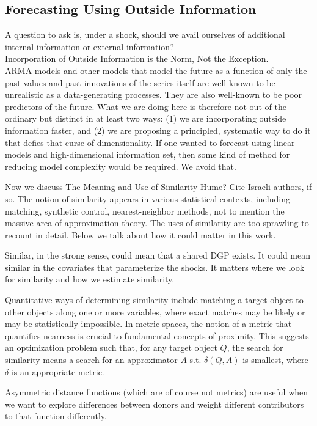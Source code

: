 \documentclass[11pt]{article}
\theoremstyle{definition}
\begin{document}
\subsection{Forecasting Using Outside Information}\label{outside_info}
A question to ask is, under a shock, should we avail ourselves of additional internal information or external information?\\
Incorporation of Outside Information is the Norm, Not the Exception. \\ 

ARMA models and other models that model the future as a function of only the past values and past innovations of the series itself are well-known to be unrealistic as a data-generating processes.  They are also well-known to be poor predictors of the future.  What we are doing here is therefore not out of the ordinary but distinct in at least two ways: (1) we are incorporating outside information faster, and (2) we are proposing a principled, systematic way to do it that defies that curse of dimensionality.  If one wanted to forecast using linear models and high-dimensional information set, then some kind of method for reducing model complexity would be required.  We avoid that.

Now we discuss The Meaning and Use of Similarity
Hume? Cite Israeli authors, if so.  The notion of similarity appears in various statistical contexts, including matching, synthetic control, nearest-neighbor methods, not to mention the massive area of approximation theory.  The uses of similarity are too sprawling to recount in detail.  Below we talk about how it could matter in this work.

Similar, in the strong sense, could mean that a shared DGP exists. It could mean similar in the covariates that parameterize the shocks.  It matters where we look for similarity and how we estimate similarity.

Quantitative ways of determining similarity include matching a target object to other objects along one or more variables, where exact matches may be likely or may be statistically impossible.  In metric spaces, the notion of a metric that quantifies nearness is crucial to fundamental concepts of proximity.  This suggests an optimization problem such that, for any target object $Q$, the search for similarity means a search for an approximator $A$ s.t. $\delta(Q,A)$ is smallest, where $\delta$ is an appropriate metric.

Asymmetric distance functions (which are of course not metrics) are useful when we want to explore differences between donors and weight different contributors to that function differently.
\end{document}

